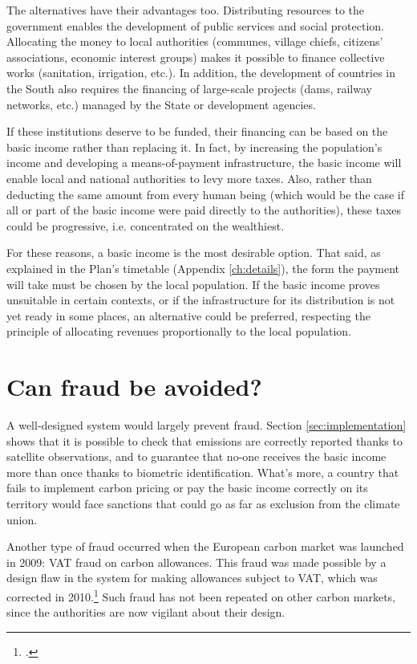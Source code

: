 \documentclass[a5paper,english,openany]{memoir}
\begin{document}
The alternatives have their advantages too. Distributing resources to the government enables the development of public services and social protection. Allocating the money to local authorities (communes, village chiefs, citizens' associations, economic interest groups) makes it possible to finance collective works (sanitation, irrigation, etc.). In addition, the development of countries in the South also requires the financing of large-scale projects (dams, railway networks, etc.) managed by the State or development agencies. 

If these institutions deserve to be funded, their financing can be based on the basic income rather than replacing it. In fact, by increasing the population's income and developing a means-of-payment infrastructure, the basic income will enable local and national authorities to levy more taxes. Also, rather than deducting the same amount from every human being (which would be the case if all or part of the basic income were paid directly to the authorities), these taxes could be progressive, i.e. concentrated on the wealthiest. 

For these reasons, a basic income is the most desirable option. That said, as explained in the Plan's timetable (Appendix \ref{ch:details}), the form the payment will take must be chosen by the local population. If the basic income proves unsuitable in certain contexts, or if the infrastructure for its distribution is not yet ready in some places, an alternative could be preferred, respecting the principle of allocating revenues proportionally to the local population. 

\section*{\normalsize Can fraud be avoided?}\label{q:fraude}

A well-designed system would largely prevent fraud. Section \ref{sec:implementation} shows that it is possible to check that emissions are correctly reported thanks to satellite observations, and to guarantee that no-one receives the basic income more than once thanks to biometric identification. What's more, a country that fails to implement carbon pricing or pay the basic income correctly on its territory would face sanctions that could go as far as exclusion from the climate union. 

Another type of fraud occurred when the European carbon market was launched in 2009: VAT fraud on carbon allowances. This fraud was made possible by a design flaw in the system for making allowances subject to VAT, which was corrected in 2010.\footnote{\citet{cour_des_comptes_fraude_2012}.} Such fraud has not been repeated on other carbon markets, since the authorities are now vigilant about their design.
\end{document}
